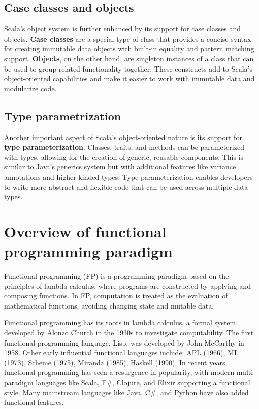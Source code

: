 \subsection{Case classes and objects}
Scala's object system is further enhanced by its support for case classes and objects. \textbf{Case classes} are a special type of class that provides a concise syntax for creating immutable data objects with built-in equality and pattern matching support. \textbf{Objects}, on the other hand, are singleton instances of a class that can be used to group related functionality together. These constructs add to Scala's object-oriented capabilities and make it easier to work with immutable data and modularize code.\footnotemark {}


\subsection{Type parametrization}
Another important aspect of Scala's object-oriented nature is its support for \textbf{type parameterization}. Classes, traits, and methods can be parameterized with types, allowing for the creation of generic, reusable components. This is similar to Java's generics system but with additional features like variance annotations and higher-kinded types. Type parameterization enables developers to write more abstract and flexible code that can be used across multiple data types.\footnotemark {}


\section{Overview of functional programming paradigm}

Functional programming (FP) is a programming paradigm based on the principles of lambda calculus, where programs are constructed by applying and composing functions.  In FP, computation is treated as the evaluation of mathematical functions, avoiding changing state and mutable data.\footnotemark
{}

Functional programming has its roots in lambda calculus, a formal system developed by Alonzo Church in the 1930s to investigate computability. The first functional programming language, Lisp, was developed by John McCarthy in 1958. Other early influential functional languages include: APL (1966), ML (1973), Scheme (1975), Miranda (1985), Haskell (1990). In recent years, functional programming has seen a resurgence in popularity, with modern multi-paradigm languages like Scala, F\#, Clojure, and Elixir supporting a functional style. Many mainstream languages like Java, C\#, and Python have also added functional features. \footnotemark
{}

